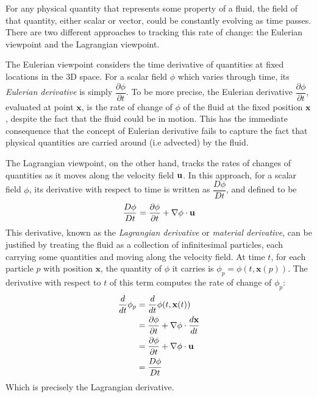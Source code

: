 For any physical quantity that represents some property of a fluid, the field of that quantity, either scalar or vector, could be constantly evolving as time passes. There are two different approaches to tracking this rate of change: the Eulerian viewpoint and the Lagrangian viewpoint.

The Eulerian viewpoint considers the time derivative of quantities at fixed locations in the 3D space. For a scalar field $\phi$ which varies through time, its \textit{Eulerian derivative} is simply $\dfrac{\partial \phi}{\partial t}$. To be more precise, the Eulerian derivative $\dfrac{\partial \phi}{\partial t}$, evaluated at point $\textbf{x}$, is the rate of change of $\phi$ of the fluid at the fixed position $\textbf{x}$, despite the fact that the fluid could be in motion. This has the immediate consequence that the concept of Eulerian derivative fails to capture the fact that physical quantities are carried around (i.e advected) by the fluid. 

The Lagrangian viewpoint, on the other hand, tracks the rates of changes of quantities as it moves along the velocity field $\textbf{u}$. In this approach, for a scalar field $\phi$, its derivative with respect to time is written as $\dfrac{D\phi}{Dt}$, and defined to be
$$
\frac{D\phi}{Dt} = \frac{\partial\phi}{\partial t} + \nabla \phi \cdot \textbf{u}
$$ 
This derivative, known as the \textit{Lagrangian derivative} or \textit{material derivative}, can be justified by treating the fluid as a collection of infinitesimal particles, each carrying some quantities and moving along the velocity field. At time $t$, for each particle $p$ with position $\textbf{x}$, the quantity of $\phi$ it carries is $\phi_p = \phi(t,\textbf{x}(p))$. The derivative with respect to $t$ of this term computes the rate of change of $\phi _p$:
$$
\begin{aligned}
    \frac{d}{dt} \phi_p
        &= \frac{d}{dt} \phi(t,\textbf{x}(t)) \\
        &= \frac{\partial \phi}{\partial t} + \nabla \phi \cdot \frac{d\textbf{x}}{dt} \\ 
        &= \frac{\partial \phi}{\partial t} + \nabla \phi \cdot \textbf{u} \\
        &=\frac{D\phi}{Dt}
\end{aligned}
$$
Which is precisely the Lagrangian derivative.

